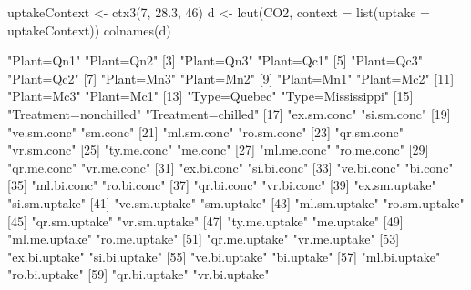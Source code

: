 \begin{Schunk}
% --begin: "pbld2"
\begin{Sinput}
 uptakeContext <- ctx3(7, 28.3, 46)
 d <- lcut(CO2, context = list(uptake = uptakeContext))
 colnames(d)
\end{Sinput}
\begin{Soutput}
 [1] "Plant=Qn1"            "Plant=Qn2"           
 [3] "Plant=Qn3"            "Plant=Qc1"           
 [5] "Plant=Qc3"            "Plant=Qc2"           
 [7] "Plant=Mn3"            "Plant=Mn2"           
 [9] "Plant=Mn1"            "Plant=Mc2"           
[11] "Plant=Mc3"            "Plant=Mc1"           
[13] "Type=Quebec"          "Type=Mississippi"    
[15] "Treatment=nonchilled" "Treatment=chilled"   
[17] "ex.sm.conc"           "si.sm.conc"          
[19] "ve.sm.conc"           "sm.conc"             
[21] "ml.sm.conc"           "ro.sm.conc"          
[23] "qr.sm.conc"           "vr.sm.conc"          
[25] "ty.me.conc"           "me.conc"             
[27] "ml.me.conc"           "ro.me.conc"          
[29] "qr.me.conc"           "vr.me.conc"          
[31] "ex.bi.conc"           "si.bi.conc"          
[33] "ve.bi.conc"           "bi.conc"             
[35] "ml.bi.conc"           "ro.bi.conc"          
[37] "qr.bi.conc"           "vr.bi.conc"          
[39] "ex.sm.uptake"         "si.sm.uptake"        
[41] "ve.sm.uptake"         "sm.uptake"           
[43] "ml.sm.uptake"         "ro.sm.uptake"        
[45] "qr.sm.uptake"         "vr.sm.uptake"        
[47] "ty.me.uptake"         "me.uptake"           
[49] "ml.me.uptake"         "ro.me.uptake"        
[51] "qr.me.uptake"         "vr.me.uptake"        
[53] "ex.bi.uptake"         "si.bi.uptake"        
[55] "ve.bi.uptake"         "bi.uptake"           
[57] "ml.bi.uptake"         "ro.bi.uptake"        
[59] "qr.bi.uptake"         "vr.bi.uptake"        
\end{Soutput}
%
% --end: "pbld2"
\end{Schunk}
